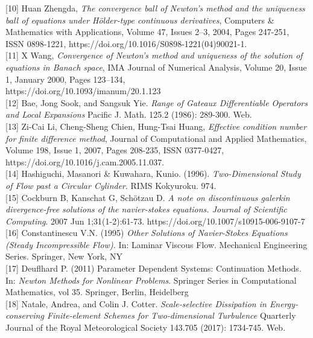 \documentclass[11pt,twoside,a4paper]{article}
\begin{document}
[10] Huan Zhengda, \textit{The convergence ball of Newton's method and the uniqueness ball of equations under Hölder-type continuous derivatives},
Computers \& Mathematics with Applications,
Volume 47, Issues 2–3,
2004,
Pages 247-251,
ISSN 0898-1221,
https://doi.org/10.1016/S0898-1221(04)90021-1.\\

[11] X Wang, \textit{Convergence of Newton's method and uniqueness of the solution of equations in Banach space}, IMA Journal of Numerical Analysis, Volume 20, Issue 1, January 2000, Pages 123–134,\\
 https://doi.org/10.1093/imanum/20.1.123\\

[12] Bae, Jong Sook, and Sangsuk Yie. \textit{Range of Gateaux Differentiable Operators and Local Expansions}  Pacific J. Math. 125.2 (1986): 289-300. Web.\\

[13] Zi-Cai Li, Cheng-Sheng Chien, Hung-Tsai Huang,\textit{
Effective condition number for finite difference method},
Journal of Computational and Applied Mathematics,
Volume 198, Issue 1,
2007,
Pages 208-235,
ISSN 0377-0427,
https://doi.org/10.1016/j.cam.2005.11.037.\\

[14] Hashiguchi, Masanori \& Kuwahara, Kunio. (1996). \textit{Two-Dimensional Study of Flow past a Circular Cylinder}. RIMS Kokyuroku. 974. \\

[15] Cockburn B, Kanschat G, Schötzau D. \textit{A note on discontinuous galerkin divergence-free solutions of the navier-stokes equations. Journal of Scientific Computing}. 2007 Jun 1;31(1-2):61-73. https://doi.org/10.1007/s10915-006-9107-7\\

[16] Constantinescu V.N. (1995) \textit{Other Solutions of Navier-Stokes Equations (Steady Incompressible Flow).} In: Laminar Viscous Flow. Mechanical Engineering Series. Springer, New York, NY\\

[17] Deuflhard P. (2011) Parameter Dependent Systems: Continuation Methods. In: \textit{Newton Methods for Nonlinear Problems}. Springer Series in Computational Mathematics, vol 35. Springer, Berlin, Heidelberg\\

[18] Natale, Andrea, and Colin J. Cotter. \textit{Scale‐selective Dissipation in Energy‐conserving Finite‐element Schemes for Two‐dimensional Turbulence}  Quarterly Journal of the Royal Meteorological Society 143.705 (2017): 1734-745. Web.\\
\end{document}
